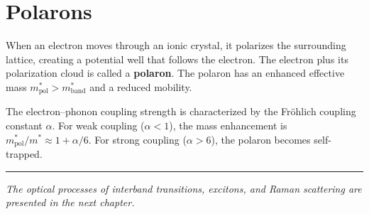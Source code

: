 \section{Polarons}

When an electron moves through an ionic crystal, it polarizes the surrounding lattice, creating a potential well that follows the electron. The electron plus its polarization cloud is called a \textbf{polaron}. The polaron has an enhanced effective mass $m^*_{\text{pol}} > m^*_{\text{band}}$ and a reduced mobility.

The electron--phonon coupling strength is characterized by the Fr\"ohlich coupling constant $\alpha$. For weak coupling ($\alpha < 1$), the mass enhancement is $m^*_{\text{pol}}/m^* \approx 1 + \alpha/6$. For strong coupling ($\alpha > 6$), the polaron becomes self-trapped.

\vspace{1cm}
\noindent\rule{\textwidth}{0.4pt}
\textit{The optical processes of interband transitions, excitons, and Raman scattering are presented in the next chapter.}
